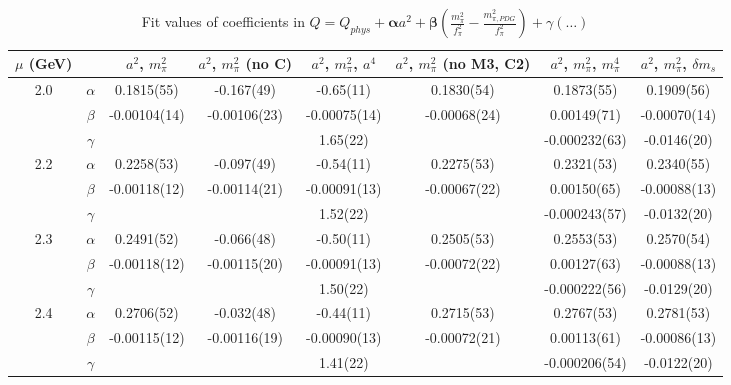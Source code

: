 \documentclass[12pt]{extarticle}
\begin{document}
\begin{table}[h!]
\begin{center}
\begin{tabular}{|c c|c|c|c|c|c|c|}
\hline
$\mu$ (GeV) &  & $a^2$, $m_\pi^2$& $a^2$, $m_\pi^2$ (no C)& $a^2$, $m_\pi^2$, $a^4$& $a^2$, $m_\pi^2$ (no M3, C2)& $a^2$, $m_\pi^2$, $m_\pi^4$& $a^2$, $m_\pi^2$, $\delta m_s$\\
\hline
\multirow{3}{0.5in}{2.0} & $\alpha$ & 0.1815(55)& -0.167(49)& -0.65(11)& 0.1830(54)& 0.1873(55)& 0.1909(56)\\
 & $\beta$ & -0.00104(14)& -0.00106(23)& -0.00075(14)& -0.00068(24)& 0.00149(71)& -0.00070(14)\\
 & $\gamma$ &  &  & 1.65(22)&  & -0.000232(63)& -0.0146(20)\\
\hline
\multirow{3}{0.5in}{2.2} & $\alpha$ & 0.2258(53)& -0.097(49)& -0.54(11)& 0.2275(53)& 0.2321(53)& 0.2340(55)\\
 & $\beta$ & -0.00118(12)& -0.00114(21)& -0.00091(13)& -0.00067(22)& 0.00150(65)& -0.00088(13)\\
 & $\gamma$ &  &  & 1.52(22)&  & -0.000243(57)& -0.0132(20)\\
\hline
\multirow{3}{0.5in}{2.3} & $\alpha$ & 0.2491(52)& -0.066(48)& -0.50(11)& 0.2505(53)& 0.2553(53)& 0.2570(54)\\
 & $\beta$ & -0.00118(12)& -0.00115(20)& -0.00091(13)& -0.00072(22)& 0.00127(63)& -0.00088(13)\\
 & $\gamma$ &  &  & 1.50(22)&  & -0.000222(56)& -0.0129(20)\\
\hline
\multirow{3}{0.5in}{2.4} & $\alpha$ & 0.2706(52)& -0.032(48)& -0.44(11)& 0.2715(53)& 0.2767(53)& 0.2781(53)\\
 & $\beta$ & -0.00115(12)& -0.00116(19)& -0.00090(13)& -0.00072(21)& 0.00113(61)& -0.00086(13)\\
 & $\gamma$ &  &  & 1.41(22)&  & -0.000206(54)& -0.0122(20)\\
\hline
\end{tabular}
\caption{Fit values of coefficients in $Q = Q_{phys} + \mathbf{\alpha} a^2 + \mathbf{\beta}\left(\frac{m_\pi^2}{f_\pi^2}-\frac{m_{\pi,PDG}^2}{f_\pi^2}\right) + \gamma(\ldots)$}
\end{center}
\end{table}





\end{document}
